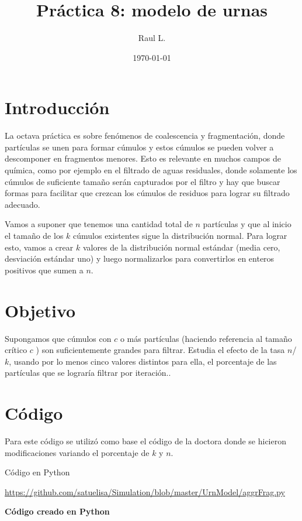 \documentclass{article}
\author{Raul L.} %
\title{Pr\'{a}ctica 8: modelo de urnas} %
\date{\today}
\begin{document}

\maketitle %


\section{Introducci\'{o}n}\label{intro} %
La octava práctica es sobre fenómenos de coalescencia y fragmentación, donde partículas se unen para formar cúmulos y estos cúmulos se pueden volver a descomponer en fragmentos menores. Esto es relevante en muchos campos de química, como por ejemplo en el filtrado de aguas residuales, donde solamente los cúmulos de suficiente tamaño serán capturados por el filtro y hay que buscar formas para facilitar que crezcan los cúmulos de residuos para lograr su filtrado adecuado.

Vamos a suponer que tenemos una cantidad total de 
$n$ partículas y que al inicio el tamaño de los $k$ cúmulos existentes sigue la distribución normal. Para lograr esto, vamos a crear $k$ valores de la distribución normal estándar (media cero, desviación estándar uno) y luego normalizarlos para convertirlos en enteros positivos que sumen a $n$\citep{2}.
\newline

\section{Objetivo}
Supongamos que cúmulos con $c$ o más partículas (haciendo referencia al tamaño crítico $c$ ) son suficientemente grandes para filtrar. Estudia el efecto de la tasa $n$/$k$, usando por lo menos cinco valores distintos para ella, el porcentaje de las partículas que se lograría filtrar por iteración.\citep{2}.

\section{C\'{o}digo}
Para este código se utilizó como base el código de la doctora donde se hicieron modificaciones variando el porcentaje de $k$ y $n$.

 Código en Python 

\url{https://github.com/satuelisa/Simulation/blob/master/UrnModel/aggrFrag.py}

{\bf Código creado en Python}
\end{document}
